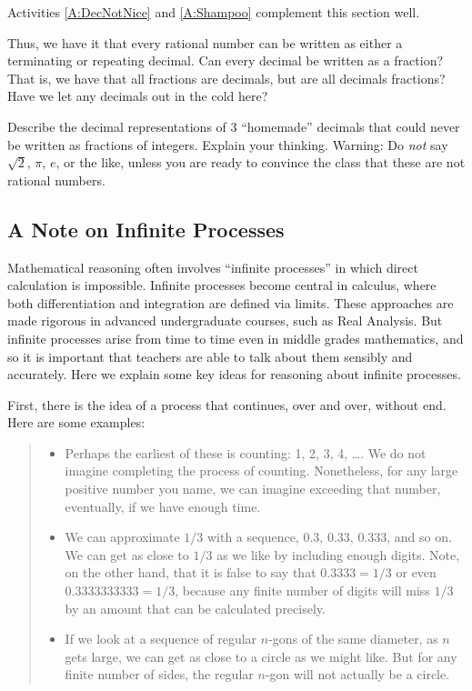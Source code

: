 \begin{activitynote}
Activities \ref{A:DecNotNice} and \ref{A:Shampoo} complement this section well. 
\end{activitynote}

Thus, we have it that every rational number can be written as either a terminating or repeating decimal.  Can every decimal be written as a fraction?  That is, we have that all fractions are decimals, but are all decimals fractions?  Have we let any decimals out in the cold here?

\begin{question} Describe the decimal representations of 3 ``homemade'' decimals that could never be written as fractions of integers.  Explain your thinking.  Warning:  Do \emph{not} say  $\sqrt{2}$, $\pi$, $e$, or the like, unless you are ready to convince the class that these are not rational numbers.
\end{question}
\QM

\subsection{A Note on Infinite Processes}
Mathematical reasoning often involves ``infinite processes'' in which direct calculation is impossible.  Infinite processes become central in calculus, where both differentiation and integration are defined via limits.  These approaches are made rigorous in advanced undergraduate courses, such as Real Analysis.  But infinite processes arise from time to time even in middle grades mathematics, and so it is important that teachers are able to talk about them sensibly and accurately.  Here we explain some key ideas for reasoning about infinite processes.  

First, there is the idea of a process that continues, over and over, without end.  
Here are some examples:
\begin{quote}
\begin{itemize}
\item Perhaps the earliest of these is counting: 1, 2, 3, 4, \dots.  We do not imagine completing the process of counting.  Nonetheless, for any large positive number you name, we can imagine exceeding that number, eventually, if we have enough time.  
\item We can approximate $1/3$ with a sequence, $0.3$, $0.33$, $0.333$, and so on.  We can get as close to $1/3$ as we like by including enough digits.  Note, on the other hand, that it is false to say that $0.3333 = 1/3$ or even $0.3333333333 = 1/3$, because any finite number of digits will miss $1/3$ by an amount that can be calculated precisely.  
\item If we look at a sequence of regular $n$-gons of the same diameter, as $n$ gets large, we can get as close to a circle as we might like.  But for any finite number of sides, the regular $n$-gon will not actually be a circle.  
\end{itemize}
\end{quote}

